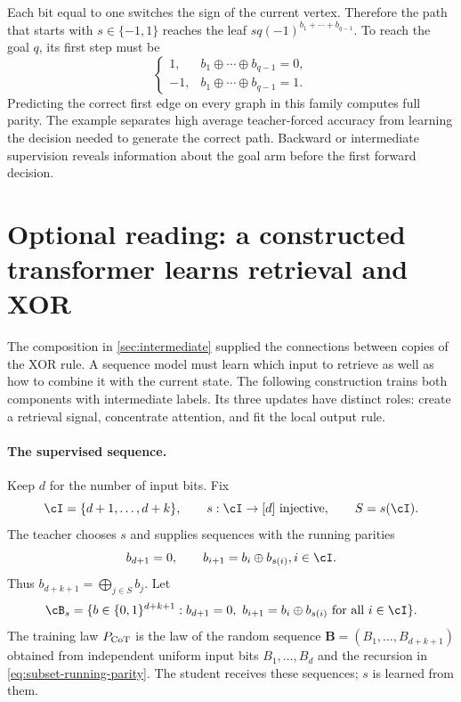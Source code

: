 \documentclass[11pt,twoside]{article}
\theoremstyle{definition}
\theoremstyle{remark}
\begin{document}
Each bit equal to one switches the sign of the current vertex. Therefore the
path that starts with $s\in\{-1,1\}$ reaches the leaf
$sq(-1)^{b_1+\cdots+b_{q-1}}$. To reach the goal $q$, its first step must be
\begin{equation}
\begin{cases}
1,&b_1\oplus\cdots\oplus b_{q-1}=0,\\
-1,&b_1\oplus\cdots\oplus b_{q-1}=1.
\end{cases}
\label{eq:path-star-parity}
\end{equation}
Predicting the correct first edge on every graph in this family computes full
parity. The example separates high average teacher-forced accuracy from
learning the decision needed to generate the correct path. Backward or
intermediate supervision reveals information about the goal arm before the
first forward decision.

\section{Optional reading: a constructed transformer learns retrieval and XOR}
\label{sec:transformer}

The composition in \cref{sec:intermediate} supplied the connections between
copies of the XOR rule. A sequence model must learn which input to retrieve
as well as how to combine it with the current state. The following
construction trains both components with intermediate labels. Its three
updates have distinct roles: create a retrieval signal, concentrate attention,
and fit the local output rule.

\paragraph{The supervised sequence.}
Keep $d$ for the number of input bits. Fix
\[
\cI=\{d+1,\ldots,d+k\},
\qquad s:\cI\to[d]\ \text{injective},
\qquad S=s(\cI).
\]
The teacher chooses $s$ and supplies sequences with the running parities
\begin{equation}
b_{d+1}=0,\qquad
b_{i+1}=b_i\oplus b_{s(i)},\quad i\in\cI.
\label{eq:subset-running-parity}
\end{equation}
Thus $b_{d+k+1}=\bigoplus_{j\in S}b_j$. Let
\[
\cB_s=\{b\in\{0,1\}^{d+k+1}:
b_{d+1}=0,\ b_{i+1}=b_i\oplus b_{s(i)}\text{ for all }i\in\cI\}.
\]
The training law $P_{\rm CoT}$ is the law of the random sequence
$\mathbf B=(B_1,\ldots,B_{d+k+1})$ obtained from independent uniform input
bits $B_1,\ldots,B_d$ and the recursion in
\cref{eq:subset-running-parity}. The student receives these sequences;
$s$ is learned from them.
\end{document}
